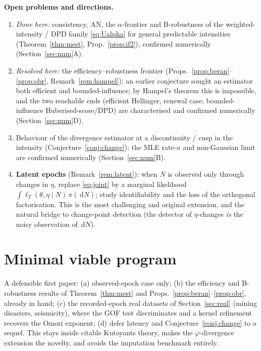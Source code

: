 \documentclass[11pt]{article}
\newcommand{\dd}{\,\mathrm{d}}
\begin{document}
\medskip
\noindent\textbf{Open problems and directions.}
\begin{enumerate}
\item[\checkmark] \emph{Done here:} consistency, AN, the $\alpha$-frontier and
B-robustness of the weighted-intensity / DPD family \eqref{eq:Ualpha} for general
predictable intensities (Theorem~\ref{thm:mest}, Prop.~\ref{prop:if2}),
confirmed numerically (Section~\ref{sec:num}A).
\item[\checkmark] \emph{Resolved here:} the efficiency--robustness frontier
(Props.~\ref{prop:beran}--\ref{prop:obr}, Remark~\ref{rem:hampel}): an earlier
conjecture sought an estimator both efficient and bounded-influence; by Hampel's
theorem this is impossible, and the two reachable ends (efficient Hellinger, renewal
case; bounded-influence Huberised-score/DPD) are characterised and confirmed
numerically (Section~\ref{sec:num}D).
\item Behaviour of the divergence estimator at a discontinuity / cusp in the
intensity (Conjecture~\ref{conj:change}); the MLE rate-$n$ and non-Gaussian limit
are confirmed numerically (Section~\ref{sec:num}B).
\item \textbf{Latent epochs} (Remark~\ref{rem:latent}): when $N$ is observed only
through changes in $\eta$, replace \eqref{eq:joint} by a marginal likelihood
$\int \ell_T(\theta,\eta\mid N)\,\pi(\dd N)$; study identifiability and the loss
of the orthogonal factorisation. This is the most challenging and original
extension, and the natural bridge to change-point detection (the detector of
$\eta$-changes \emph{is} the noisy observation of $\dd N$).
\end{enumerate}

\section{Minimal viable program}
A defensible first paper: (a) observed-epoch case only; (b) the efficiency and
B-robustness results of Theorem~\ref{thm:mest} and Props.~\ref{prop:beran}--\ref{prop:obr}, already in
hand; (c) the recorded-epoch real datasets of Section~\ref{sec:real} (mining
disasters, seismicity), where the GOF test discriminates and a kernel refinement
recovers the Omori exponent; (d) defer latency and Conjecture~\ref{conj:change} to a
sequel. This stays inside citable Kutoyants
theory, makes the $\varphi$-divergence extension the novelty, and avoids the
imputation benchmark entirely.

\appendix
\end{document}
